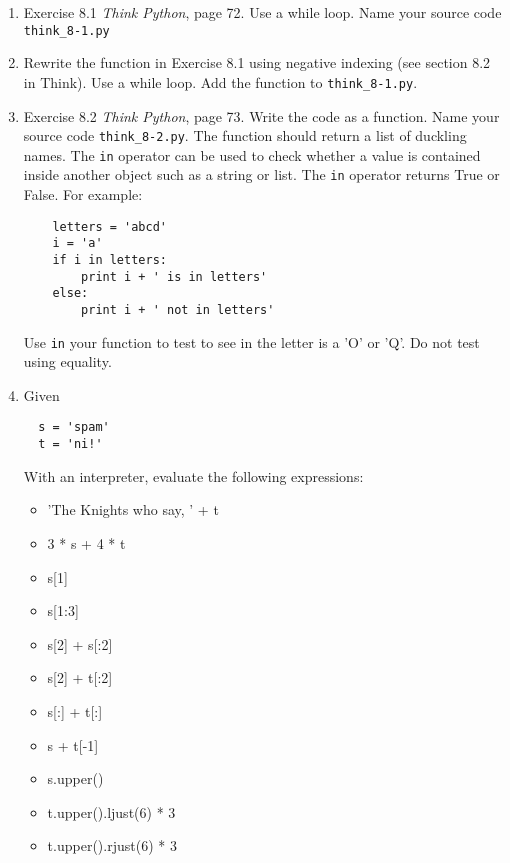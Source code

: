 \documentclass[12pt]{article}
\begin{document}
\begin{enumerate}
  \item Exercise 8.1 \emph{Think Python}, page 72. Use a while loop. Name your source code \texttt{think\_8-1.py}

  \item Rewrite the function in Exercise 8.1 using negative indexing (see section 8.2 in Think). Use a while loop. Add the function to \texttt{think\_8-1.py}. 
  
  \item Exercise 8.2 \emph{Think Python}, page 73. Write the code as a function. Name your source code \texttt{think\_8-2.py}. The function should return a list of duckling names. The \texttt{in} operator can be used to check whether a value is contained inside another object such as a string or list. The \texttt{in} operator returns True or False. For example:

    \begin{verbatim}
    letters = 'abcd'
    i = 'a'
    if i in letters:
        print i + ' is in letters'  
    else:
        print i + ' not in letters'

  \end{verbatim}

  Use \texttt{in} your function to test to see in the letter is a 'O' or 'Q'. Do not test using equality. 

\item Given

  \begin{verbatim}
  s = 'spam'
  t = 'ni!'
  \end{verbatim}

  With an interpreter, evaluate the following expressions:

  \begin{itemize}
  \item 'The Knights who say, ' + t
  \item 3 * s + 4 * t
  \item s[1]
  \item s[1:3]
    \item s[2] + s[:2]
  \item s[2] + t[:2]
  \item s[:] + t[:]
  \item s + t[-1]
  \item s.upper()
  \item t.upper().ljust(6) * 3
  \item t.upper().rjust(6) * 3
  \end{itemize}



\end{enumerate}
\end{document}
